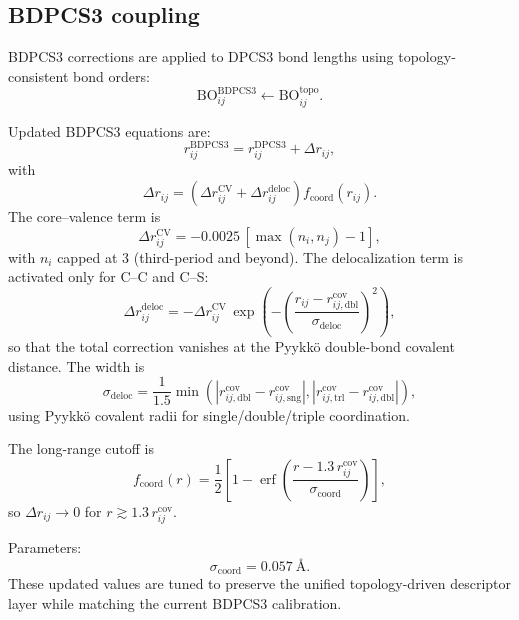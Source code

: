 \documentclass[journal=jctcce,manuscript=article]{achemso}
\begin{document}
\subsection{BDPCS3 coupling}
BDPCS3 corrections are applied to DPCS3 bond lengths using topology-consistent bond orders:
\begin{equation}
\mathrm{BO}_{ij}^{\mathrm{BDPCS3}} \leftarrow \mathrm{BO}_{ij}^{\mathrm{topo}}.
\end{equation}

Updated BDPCS3 equations are:
\begin{equation}
r_{ij}^{\mathrm{BDPCS3}}=r_{ij}^{\mathrm{DPCS3}}+\Delta r_{ij},
\end{equation}
with
\begin{equation}
\Delta r_{ij}=\left(\Delta r^{\mathrm{CV}}_{ij}+\Delta r^{\mathrm{deloc}}_{ij}\right)
f_{\mathrm{coord}}(r_{ij}).
\end{equation}
The core--valence term is
\begin{equation}
\Delta r^{\mathrm{CV}}_{ij}=-0.0025\,[\max(n_i,n_j)-1],
\end{equation}
with $n_i$ capped at 3 (third-period and beyond). The delocalization term is activated only for C--C and C--S:
\begin{equation}
\Delta r^{\mathrm{deloc}}_{ij}=
-\Delta r^{\mathrm{CV}}_{ij}\,
\exp\!\left(-\left(\frac{r_{ij}-r^{\mathrm{cov}}_{ij,\mathrm{dbl}}}{\sigma_{\mathrm{deloc}}}\right)^2\right),
\end{equation}
so that the total correction vanishes at the Pyykk\"o double-bond covalent distance. The width is
\begin{equation}
\sigma_{\mathrm{deloc}}=\frac{1}{1.5}\min\!\left(\left|r^{\mathrm{cov}}_{ij,\mathrm{dbl}}-r^{\mathrm{cov}}_{ij,\mathrm{sng}}\right|,
\left|r^{\mathrm{cov}}_{ij,\mathrm{trl}}-r^{\mathrm{cov}}_{ij,\mathrm{dbl}}\right|\right),
\end{equation}
using Pyykk\"o covalent radii for single/double/triple coordination.

The long-range cutoff is
\begin{equation}
f_{\mathrm{coord}}(r)=\frac{1}{2}\left[1-\operatorname{erf}\!\left(\frac{r-1.3\,r^{\mathrm{cov}}_{ij}}{\sigma_{\mathrm{coord}}}\right)\right],
\end{equation}
so $\Delta r_{ij}\to 0$ for $r\gtrsim 1.3\,r^{\mathrm{cov}}_{ij}$.

Parameters:
\begin{equation}
\sigma_{\mathrm{coord}}=0.057~\text{\AA}.
\end{equation}
These updated values are tuned to preserve the unified topology-driven descriptor layer while matching the current BDPCS3 calibration.
\end{document}
